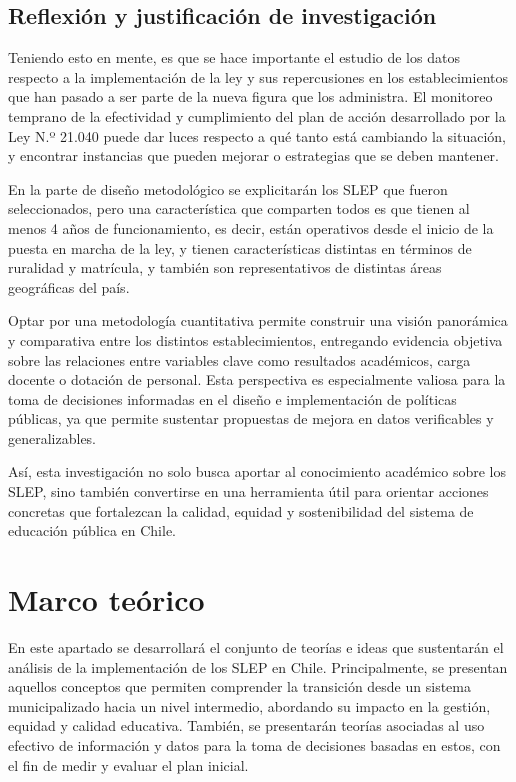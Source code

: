 \documentclass[
  12pt,
  letterpaper,
]{article}
\begin{document}
\subsection{Reflexión y justificación de investigación}\label{reflexiuxf3n-y-justificaciuxf3n-de-investigaciuxf3n}

Teniendo esto en mente, es que se hace importante el estudio de los datos respecto a la implementación de la ley y sus repercusiones en los establecimientos que han pasado a ser parte de la nueva figura que los administra.
El monitoreo temprano de la efectividad y cumplimiento del plan de acción desarrollado por la Ley N.º 21.040 puede dar luces respecto a qué tanto está cambiando la situación, y encontrar instancias que pueden mejorar o estrategias que se deben mantener.

En la parte de diseño metodológico se explicitarán los SLEP que fueron seleccionados, pero una característica que comparten todos es que tienen al menos 4 años de funcionamiento, es decir, están operativos desde el inicio de la puesta en marcha de la ley, y tienen características distintas en términos de ruralidad y matrícula, y también son representativos de distintas áreas geográficas del país.

Optar por una metodología cuantitativa permite construir una visión panorámica y comparativa entre los distintos establecimientos, entregando evidencia objetiva sobre las relaciones entre variables clave como resultados académicos, carga docente o dotación de personal.
Esta perspectiva es especialmente valiosa para la toma de decisiones informadas en el diseño e implementación de políticas públicas, ya que permite sustentar propuestas de mejora en datos verificables y generalizables.

Así, esta investigación no solo busca aportar al conocimiento académico sobre los SLEP, sino también convertirse en una herramienta útil para orientar acciones concretas que fortalezcan la calidad, equidad y sostenibilidad del sistema de educación pública en Chile.

\newpage

\section{Marco teórico}\label{marco-teuxf3rico}

En este apartado se desarrollará el conjunto de teorías e ideas que sustentarán el análisis de la implementación de los SLEP en Chile.
Principalmente, se presentan aquellos conceptos que permiten comprender la transición desde un sistema municipalizado hacia un nivel intermedio, abordando su impacto en la gestión, equidad y calidad educativa.
También, se presentarán teorías asociadas al uso efectivo de información y datos para la toma de decisiones basadas en estos, con el fin de medir y evaluar el plan inicial.
\end{document}
